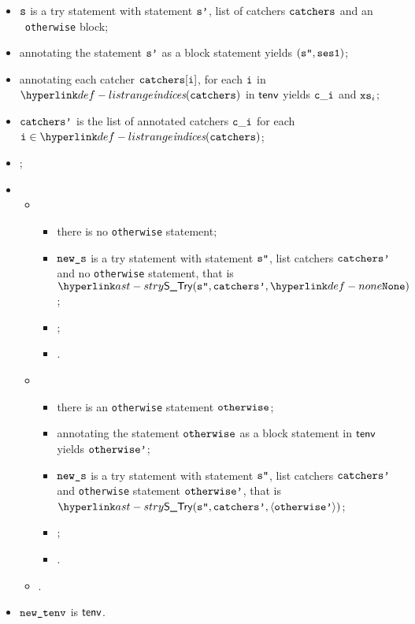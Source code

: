 \ProseParagraph
\AllApply
\begin{itemize}
  \item $\texttt{s}$ is a try statement with statement $\texttt{s'}$, list of catchers $\texttt{catchers}$ and an \optional\ \texttt{otherwise} block;
  \item annotating the statement $\texttt{s'}$ as a block statement yields $(\texttt{s''}, \texttt{ses1})$\ProseOrTypeError;
  \item annotating each catcher $\texttt{catchers}[\texttt{i}]$, for each $\texttt{i}$ in $\listrange(\catchers)$ in $\textsf{tenv}$ yields $\texttt{c}\_\texttt{i}$
        and $\texttt{xs}_i$\ProseOrTypeError;
  \item $\texttt{catchers'}$ is the list of annotated catchers $\texttt{c}\_\texttt{i}$ for each $\vi\in\listrange(\catchers)$;
  \item {};
  \item \OneApplies
  \begin{itemize}
    \item {}
    \begin{itemize}
      \item there is no \texttt{otherwise} statement;
      \item $\texttt{new\_s}$ is a try statement with statement $\texttt{s''}$, list catchers $\texttt{catchers'}$ and no \texttt{otherwise} statement,
            that is \\
            $\STry(\vspp, \catchersp, \None)$;
      \item {};
      \item \Proseeqdef{$\vsesthree$}{$\vsestwo$}.
    \end{itemize}

    \item {}
    \begin{itemize}
      \item there is an \texttt{otherwise} statement $\texttt{otherwise}$;
      \item annotating the statement $\texttt{otherwise}$ as a block statement in $\textsf{tenv}$ yields $\texttt{otherwise'}$\ProseOrTypeError;
      \item $\texttt{new\_s}$ is a try statement with statement $\texttt{s''}$, list catchers $\texttt{catchers'}$ and \texttt{otherwise} statement
            $\texttt{otherwise'}$, that is \\
            $\STry(\vspp, \catchersp, \langle\otherwisep\rangle)$;
      \item \Proseeqdef{$\vsesotherwise$}{$\vsesblock$};
      \item {}.
    \end{itemize}

    \item {}.
  \end{itemize}
  \item $\texttt{new\_tenv}$ is $\textsf{tenv}$.
\end{itemize}

